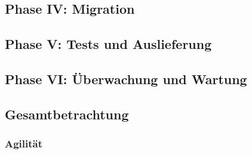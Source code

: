 \subsection{Phase IV: Migration}
\subsection{Phase V: Tests und Auslieferung}
\subsection{Phase VI: Überwachung und Wartung}
\subsection{Gesamtbetrachtung}
\subsubsection{Agilität}



